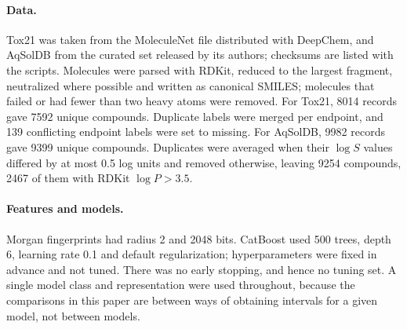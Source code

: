 \documentclass[10pt]{article}
\begin{document}
\paragraph{Data.} Tox21 was taken from the MoleculeNet file distributed with DeepChem, and AqSolDB from the curated set released by its authors;\citep{Sorkun2019AqSolDB} checksums are listed with the scripts. Molecules were parsed with RDKit,\citep{RDKit} reduced to the largest fragment, neutralized where possible and written as canonical SMILES; molecules that failed or had fewer than two heavy atoms were removed. For Tox21, 8014 records gave 7592 unique compounds. Duplicate labels were merged per endpoint, and 139 conflicting endpoint labels were set to missing. For AqSolDB, 9982 records gave 9399 unique compounds. Duplicates were averaged when their $\log S$ values differed by at most 0.5 log units and removed otherwise, leaving 9254 compounds, 2467 of them with RDKit $\log P>3.5$.

\paragraph{Features and models.} Morgan fingerprints\citep{Rogers2010Morgan} had radius 2 and 2048 bits. CatBoost\citep{Prokhorenkova2018CatBoost} used 500 trees, depth 6, learning rate 0.1 and default regularization; hyperparameters were fixed in advance and not tuned. There was no early stopping, and hence no tuning set. A single model class and representation were used throughout, because the comparisons in this paper are between ways of obtaining intervals for a given model, not between models.
\end{document}
